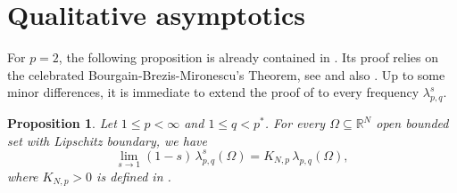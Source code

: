 \documentclass{amsart}
\newtheorem{proposition}[theorem]{Proposition}
\theoremstyle{definition}
\numberwithin{equation}{section}
\begin{document}
\section{Qualitative asymptotics}
\label{sec:app}
For $p=2$, the following proposition is already contained in \cite[Lemma A.1]{BCV}. Its proof relies on the celebrated Bourgain-Brezis-Mironescu's Theorem, see \cite{BBM} and also \cite[Corollary 4]{Bre_constant}.  Up to some minor differences, it is immediate to extend the proof of \cite[Lemma A.1]{BCV} to every frequency $\lambda^s_{p,q}$. 
\begin{proposition}  \label{prop:asym-s-1}
	Let $1\leq p<\infty$ and $1\leq q<p^*$. For every $\Omega \subseteq \mathbb{R}^N$ open bounded set with Lipschitz boundary, we have 
	\begin{equation*}\label{eq:equality for lipschitz}
		\lim _{s \to 1}(1-s)\,\lambda_{p, q}^s(\Omega) = K_{N,p}\,\lambda_{p,q}(\Omega),
	\end{equation*}
	where $K_{N,p} > 0$ is defined in \cite[pag. 6]{BBM}. 
\end{proposition}
\end{document}

